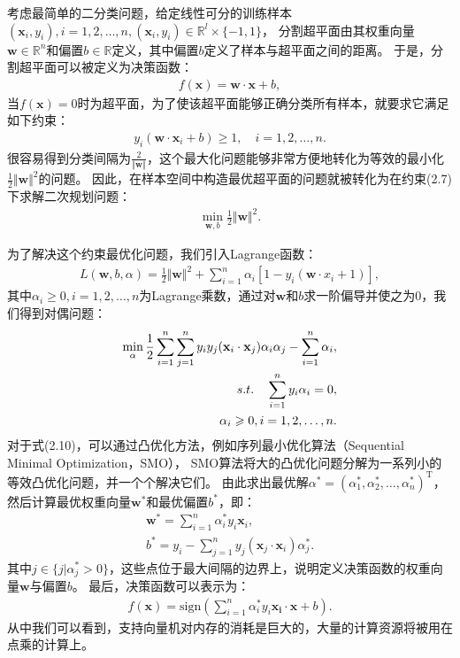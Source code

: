 考虑最简单的二分类问题，给定线性可分的训练样本$(\mathbf{x}_i,y_i),i=1,2,\ldots,n,(\mathbf{x}_i,y_i)\in\mathbb{R}^l\times\{-1,1\}$，
分割超平面由其权重向量$\mathbf{w}\in\mathbb{R}^n$和偏置$b\in\mathbb{R}$定义，其中偏置$b$定义了样本与超平面之间的距离。
于是，分割超平面可以被定义为决策函数：
\begin{align}
    f(\mathbf{x})=\mathbf{w}\cdot\mathbf{x}+b,
\end{align}
当$f(\mathbf{x})=0$时为超平面，为了使该超平面能够正确分类所有样本，就要求它满足如下约束：
\begin{align}
    y_i(\mathbf{w}\cdot\mathbf{x}_i+b)\geq1,\quad i=1,2,\ldots,n.
\end{align}
很容易得到分类间隔为$\frac{2}{\Vert\mathbf{w}\Vert}$，这个最大化问题能够非常方便地转化为等效的最小化$\frac{1}{2}\Vert\mathbf{w}\Vert^2$的问题。
因此，在样本空间中构造最优超平面的问题就被转化为在约束(2.7)下求解二次规划问题：
\begin{align}
    \min_{\mathbf{w},b}\frac{1}{2}\Vert\mathbf{w}\Vert^2.
\end{align}

为了解决这个约束最优化问题，我们引入Lagrange函数：
\begin{align}
    L(\mathbf{w},b,\alpha)=\frac{1}{2}\Vert\mathbf{w}\Vert^2+\sum_{i=1}^n\alpha_i[1-y_i(\mathbf{w}\cdot x_i+1)],
\end{align}
其中$\alpha_i\geq0, i=1,2,\ldots,n$为Lagrange乘数，通过对$\mathbf{w}$和$b$求一阶偏导并使之为0，我们得到对偶问题：
\begin{align}
    \min_\alpha\frac{1}{2}\sum_{i=1}^n\sum_{j=1}^ny_iy_j(\mathbf{x}_i\cdot\mathbf{x}_j)\alpha_i\alpha_j-\sum_{i=1}^n\alpha_i, \\
    s.t.\quad \sum_{i=1}^ny_i\alpha_i=0, \notag \\
    \alpha_i\geq0,i=1,2,\ldots,n.\notag
\end{align}
对于式(2.10)，可以通过凸优化方法，例如序列最小优化算法（Sequential Minimal Optimization，SMO），
SMO算法将大的凸优化问题分解为一系列小的等效凸优化问题，并一个个解决它们。
由此求出最优解$\alpha^*=(\alpha_1^*,\alpha_2^*,\ldots,\alpha_n^*)^\mathrm{T}$，
然后计算最优权重向量$\mathbf{w}^*$和最优偏置$b^*$，即：
\begin{align}
    \mathbf{w}^*=\sum_{i=1}^n\alpha_i^*y_i\mathbf{x}_i, \\
    b^*=y_i-\sum_{j=1}^ny_j(\mathbf{x}_j\cdot\mathbf{x}_i)\alpha_j^*.
\end{align}
其中$j\in\{j|\alpha_j^*>0\}$，这些点位于最大间隔的边界上，说明定义决策函数的权重向量$\mathbf{w}$与偏置$b$。
最后，决策函数可以表示为：
\begin{align}
    f(\mathbf{x})=\mathrm{sign}(\sum_{i=1}^n\alpha_i^*y_i\mathbf{x_i}\cdot\mathbf{x}+b).
\end{align}
从中我们可以看到，支持向量机对内存的消耗是巨大的，大量的计算资源将被用在点乘的计算上。

